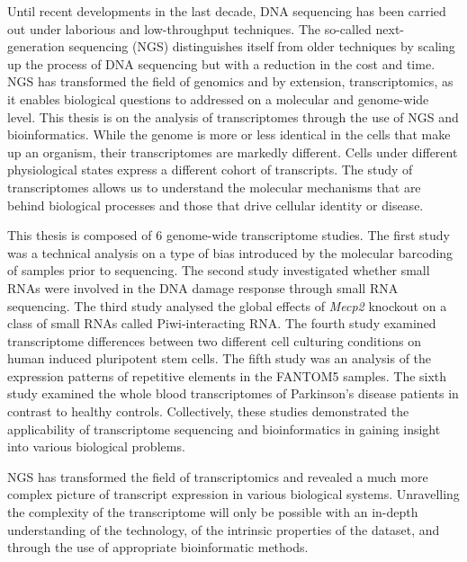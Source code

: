 Until recent developments in the last decade, DNA sequencing has been carried out under laborious and low-throughput techniques. The so-called next-generation sequencing (NGS) distinguishes itself from older techniques by scaling up the process of DNA sequencing but with a reduction in the cost and time. NGS has transformed the field of genomics and by extension, transcriptomics, as it enables biological questions to addressed on a molecular and genome-wide level. This thesis is on the analysis of transcriptomes through the use of NGS and bioinformatics. While the genome is more or less identical in the cells that make up an organism, their transcriptomes are markedly different. Cells under different physiological states express a different cohort of transcripts. The study of transcriptomes allows us to understand the molecular mechanisms that are behind biological processes and those that drive cellular identity or disease.

This thesis is composed of 6 genome-wide transcriptome studies. The first study was a technical analysis on a type of bias introduced by the molecular barcoding of samples prior to sequencing. The second study investigated whether small RNAs were involved in the DNA damage response through small RNA sequencing. The third study analysed the global effects of \textit{Mecp2} knockout on a class of small RNAs called Piwi-interacting RNA. The fourth study examined transcriptome differences between two different cell culturing conditions on human induced pluripotent stem cells. The fifth study was an analysis of the expression patterns of repetitive elements in the FANTOM5 samples. The sixth study examined the whole blood transcriptomes of Parkinson's disease patients in contrast to healthy controls. Collectively, these studies demonstrated the applicability of transcriptome sequencing and bioinformatics in gaining insight into various biological problems.

NGS has transformed the field of transcriptomics and revealed a much more complex picture of transcript expression in various biological systems. Unravelling the complexity of the transcriptome will only be possible with an in-depth understanding of the technology, of the intrinsic properties of the dataset, and through the use of appropriate bioinformatic methods.
